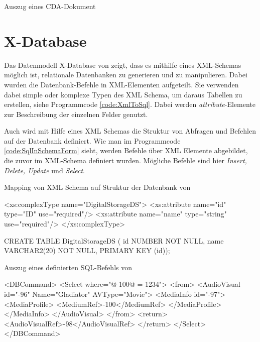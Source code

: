 \begin{program}
\caption{Auszug eines CDA-Dokument}
\label{code:CDA}
    
\end{program}

\section{X-Database}
Das Datenmodell X-Database von \textcite{Varlamis2001BridgingXA} zeigt, dass es mithilfe eines XML-Schemas möglich ist, relationale Datenbanken zu generieren und zu manipulieren. Dabei wurden die Datenbank-Befehle in XML-Elementen aufgeteilt. Sie verwenden dabei simple oder komplexe Typen des XML Schema, um daraus Tabellen zu erstellen, siehe Programmcode \ref{code:XmlToSql}. Dabei werden \emph{attribute}-Elemente zur Beschreibung der einzelnen Felder genutzt. 

Auch wird mit Hilfe eines XML Schemas die Struktur von Abfragen und Befehlen auf der Datenbank definiert. Wie man im Programmcode \ref{code:SqlInSchemaForm} sieht, werden Befehle über XML Elemente abgebildet, die zuvor im XML-Schema definiert wurden. Mögliche Befehle sind hier \emph{Insert, Delete, Update} und \emph{Select}.

\begin{program}
\caption{Mapping von XML Schema auf Struktur der Datenbank von \textcite{Varlamis2001BridgingXA}}
\label{code:XmlToSql}
\begin{XmlCode}
<xs:complexType name="DigitalStorageDS">
<xs:attribute name="id" type="ID"
use="required"/>
<xs:attribute name="name" type="string"
use="required"/>
</xs:complexType>
\end{XmlCode}
\label{code:ResultingSQL}
\begin{GenericCode}
CREATE TABLE DigitalStorageDS (
id NUMBER NOT NULL,
name VARCHAR2(20) NOT NULL,
PRIMARY KEY (id));
\end{GenericCode}
\end{program}


\begin{program}
\caption{Auszug eines definierten SQL-Befehls von \textcite{Varlamis2001BridgingXA}}
\label{code:SqlInSchemaForm}
\begin{GenericCode}
    <DBCommand>
    <Select where="@-100@ = 1234">
    <from>
        <AudioVisual id="-96" Name="Gladiator"
         AVType="Movie">
            <MediaInfo id="-97">
            <MediaProfile>
            <MediumRef>-100</MediumRef>
            </MediaProfile>
            </MediaInfo>
        </AudioVisual>
    </from>
    <return>
    <AudioVisualRef>-98</AudioVisualRef>
    </return>
    </Select>
    </DBCommand>
\end{GenericCode}
\end{program}
